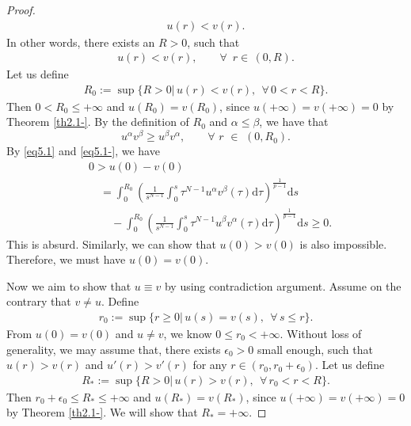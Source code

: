 \documentclass[12pt]{amsart}
\theoremstyle{definition}
\theoremstyle{remark}
\theoremstyle{conclusion}
\theoremstyle{conjecture}
\numberwithin{equation}{section}
\begin{document}
\begin{proof}
\begin{align}
        u(r)<v(r).
    \end{align}
    In other words, there exists an $R>0$, such that
    \begin{align}\label{ineq5.2-}
        u(r)<v(r), \qquad \forall \,\,\,r\in\,(0,R).
    \end{align}
    Let us define
    \begin{align}\label{a2}
    R_0:=\sup\{R>0|\,u(r)<v(r),\ \ \forall \,0<r<R\}.
    \end{align}
    Then $0<R_0 \leq +\infty$ and $u(R_0)=v(R_0)$, since $u(+\infty)=v(+\infty)=0$ by Theorem \ref{th2.1-}. By the definition of $R_0$ and $\alpha\leq\beta$, we have that
    $$u^\alpha v^\beta\geq u^\beta v^\alpha, \qquad \forall \,\, r\,\,\in \,\,(0, R_0).$$
    By \eqref{eq5.1} and \eqref{eq5.1-}, we have
    \begin{align}\label{ineq5.3}
    &0>u(0)-v(0)\\
    &\quad=\int_0^{R_0} \left(\frac{1}{s^{N-1}} \int_0^s \tau^{N-1}u^\alpha v^\beta(\tau) \mathrm{d}\tau\right)^{\frac{1}{p-1}}\mathrm{d}s\nonumber\\
    &\quad \quad -\int_0^{R_0}\left(\frac{1}{s^{N-1}} \int_0^s \tau^{N-1}u^\beta v^\alpha(\tau) \mathrm{d}\tau\right)^{\frac{1}{p-1}}\mathrm{d}s\geq 0.\nonumber
    \end{align}
    This is absurd. Similarly, we can show that $u(0)>v(0)$ is also impossible. Therefore, we must have $u(0)=v(0)$.

Now we aim to show that $u\equiv v$ by using contradiction argument. Assume on the contrary that $v\neq u$. Define
\begin{align}\label{24q}
r_0:=\sup\{r\geq0|\, u(s)=v(s),\ \ \forall \,s\leq r\}.
\end{align}
From $u(0)=v(0)$ and $u\ne v$, we know $0\leq r_0<+\infty$. Without loss of generality, we may assume that, there exists $\epsilon_{0}>0$ small enough, such that $u(r) > v(r)$ and $u'(r)>v'(r)$ for any $r\in(r_0,r_0+\epsilon_{0})$. Let us define
    \begin{align}\label{a3}
    R_*:=\sup\{R>0|\,u(r)>v(r),\ \ \forall \,r_{0}<r<R\}.
    \end{align}
    Then $r_{0}+\epsilon_0\leq R_* \leq +\infty$ and $u(R_*)=v(R_*)$, since $u(+\infty)=v(+\infty)=0$ by Theorem \ref{th2.1-}. We will show that $R_*=+\infty$.


\end{proof}
\end{document}
